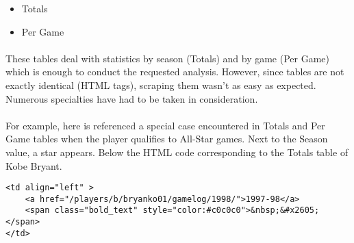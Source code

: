 \begin{itemize}
	\item Totals
	\item Per Game
\end{itemize}

\paragraph{}These tables deal with statistics by season (Totals) and by game (Per Game) which is enough to conduct the requested analysis. However, since tables are not exactly identical (HTML tags), scraping them wasn't as easy as expected. Numerous specialties have had to be taken in consideration.

\paragraph{}For example, here is referenced a special case encountered in Totals and Per Game tables when the player qualifies to All-Star games. Next to the Season value, a star appears. Below the HTML code corresponding to the Totals table of Kobe Bryant.

\begin{verbatim}
<td align="left" >
	<a href="/players/b/bryanko01/gamelog/1998/">1997-98</a>
	<span class="bold_text" style="color:#c0c0c0">&nbsp;&#x2605;</span>
</td>
\end{verbatim}

